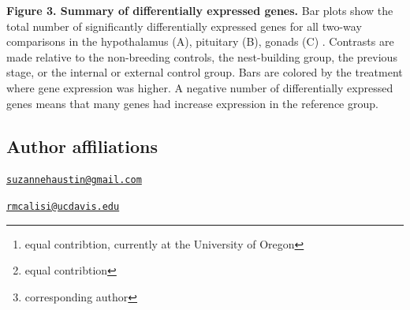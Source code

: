 \textbf{Figure 3. Summary of differentially expressed genes.} Bar plots
show the total number of significantly differentially expressed genes
for all two-way comparisons in the hypothalamus (A), pituitary (B),
gonads (C) . Contrasts are made relative to the non-breeding controls,
the nest-building group, the previous stage, or the internal or external
control group. Bars are colored by the treatment where gene expression
was higher. A negative number of differentially expressed genes means
that many genes had increase expression in the reference group.

\newpage

\hypertarget{author-affiliations}{%
\subsection{Author affiliations}\label{author-affiliations}}


\address{%
Suzanne H. Austin \footnote{equal contribtion, currently at the
  University of Oregon}\\
University of California, Davis\\
\\
}
\href{mailto:suzannehaustin@gmail.com}{\nolinkurl{suzannehaustin@gmail.com}}

\address{%
Rayna M Harris \footnote{equal contribtion}\\
University of California, Davis\\
\\
}


\address{%
Andrew S. Lang\\
University of New Hampshire\\
\\
}


\address{%
Victoria S. Farrar\\
University of California, Davis\\
\\
}


\address{%
April Booth\\
University of California, Davis\\
\\
}


\address{%
Tanner Feustel\\
University of California, Davis\\
\\
}


\address{%
Matthew D. MacManes\\
University of New Hampshire\\
\\
}


\address{%
Rebecca M. Calisi \footnote{corresponding author}\\
University of California, Davis\\
\\
}
\href{mailto:rmcalisi@ucdavis.edu}{\nolinkurl{rmcalisi@ucdavis.edu}}

